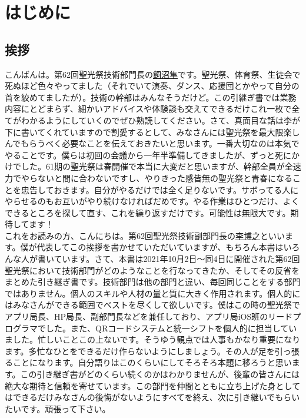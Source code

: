 \documentclass[dvipdfmx,jb5]{jarticle}
\newcommand{\mail}[2]{\href{mailto:#2}{#1}}
\begin{document}
\newpage
\setcounter{tocdepth}{5}
\hypertarget{top}{\tableofcontents}

\section{はじめに}
\subsection{挨拶}
こんばんは。第62回聖光祭技術部門長の\mail{飼沼隼}{60050kainuma@seiko.ac.jp}です。聖光祭、体育祭、生徒会で死ぬほど色々やってました（それでいて演奏、ダンス、応援団とかやって自分の首を絞めてましたが）。技術の幹部はみんなそうだけど。この引継ぎ書では業務内容にとどまらず、細かいアドバイスや体験談も交えてできるだけこれ一枚で全てがわかるようにしていくのでぜひ熟読してください。さて、真面目な話は李が下に書いてくれていますので割愛するとして、みなさんには聖光祭を最大限楽しんでもらうべく必要なことを伝えておきたいと思います。一番大切なのは本気でやることです。僕らは初回の会議から一年半準備してきましたが、ずっと死にかけでした。61期の聖光祭は春開催で本当に大変だと思いますが、幹部全員が全速力でやらないと間に合わないですし、やりきった感皆無の聖光祭と青春になることを忠告しておきます。自分がやるだけでは全く足りないです。サボってる人にやらせるのもお互いがやり続けなければだめです。やる作業はひとつだけ、よくできるところを探して直す、これを繰り返すだけです。可能性は無限大です。期待してます！
\\

これをお読みの方、こんにちは。第62回聖光祭技術副部門長の\mail{李博之}{60227li@seiko.ac.jp}といいます。僕が代表してこの挨拶を書かせていただいていますが、もちろん本書はいろんな人が書いています。さて、本書は2021年10月2日〜同4日に開催された第62回聖光祭において技術部門がどのようなことを行なってきたか、そしてその反省をまとめた引き継ぎ書です。技術部門は他の部門と違い、毎回同じことをする部門ではありません。個人のスキルや人材の量と質に大きく作用されます。個人的にはみなさんができる範囲でベストを尽くして欲しいです。僕はこの時の聖光祭でアプリ局長、HP局長、副部門長などを兼任しており、アプリ局iOS班のリードプログラマでした。また、QRコードシステムと統一シフトを個人的に担当していました。忙しいことこの上ないです。そうゆう観点では人事もかなり重要になります。多忙なひとをできるだけ作らないようにしましょう。その人が足を引っ張ることになります。自分語りはこのくらいにしてそろそろ本題に移ろうと思います。この引き継ぎ書がどのくらい続くのかはわかりませんが、後輩の皆さんには絶大な期待と信頼を寄せています。この部門を仲間とともに立ち上げた身としてはできるだけみなさんの後悔がないようにすべてを終え、次に引き継いでもらいたいです。頑張って下さい。
\end{document}
